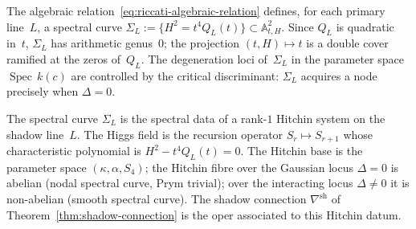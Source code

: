 \begin{corollary}
\label{cor:spectral-curve}
The algebraic relation~\eqref{eq:riccati-algebraic-relation}
defines, for each primary line~$L$, a spectral curve
$\Sigma_L := \{H^2 = t^4 Q_L(t)\} \subset \mathbb{A}^2_{t,H}$.
Since $Q_L$ is quadratic in~$t$, $\Sigma_L$ has arithmetic
genus~$0$; the projection $(t,H) \mapsto t$ is a double cover
ramified at the zeros of~$Q_L$.  The degeneration loci of~$\Sigma_L$
in the parameter space $\operatorname{Spec}\,k(c)$ are
controlled by the critical discriminant: $\Sigma_L$ acquires a
node precisely when $\Delta = 0$.
\end{corollary}

\begin{remark}
\label{rem:hitchin-interpretation}
The spectral curve $\Sigma_L$ is the spectral data of a
rank-$1$ Hitchin system on the shadow line~$L$.
The Higgs field is the recursion operator
$S_r \mapsto S_{r+1}$ whose characteristic polynomial
is $H^2 - t^4 Q_L(t) = 0$.
The Hitchin base is the parameter space
$(\kappa, \alpha, S_4)$; the Hitchin fibre over the
Gaussian locus $\Delta = 0$ is abelian (nodal spectral
curve, Prym trivial); over the interacting locus
$\Delta \neq 0$ it is non-abelian (smooth spectral
curve).  The shadow connection
$\nabla^{\mathrm{sh}}$ of
Theorem~\ref{thm:shadow-connection} is the oper
associated to this Hitchin datum.
\end{remark}

